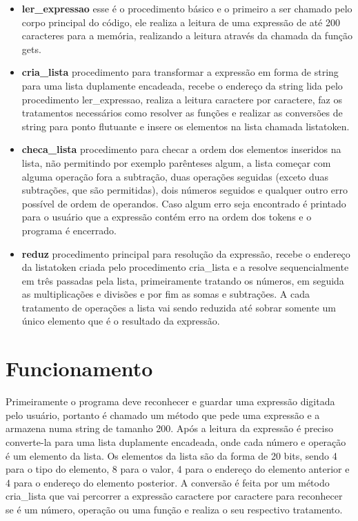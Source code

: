 \documentclass[12pt]{article}
\begin{document}
\begin{itemize}

\item \textbf{ler\_expressao} esse é o procedimento básico e o primeiro a ser chamado pelo corpo principal do código, ele realiza a leitura de uma expressão de até 200 caracteres para a memória, realizando a leitura através da chamada da função gets.

\item \textbf{cria\_lista} procedimento para transformar a expressão em forma de string para uma lista duplamente encadeada, recebe o endereço da string lida pelo procedimento ler\_expressao, realiza a leitura caractere por caractere, faz os tratamentos necessários como resolver as funções e realizar as conversões de string para ponto flutuante e insere os elementos na lista chamada listatoken.

\item \textbf{checa\_lista} procedimento para checar a ordem dos elementos inseridos na lista, não permitindo por exemplo parênteses algum, a lista começar com alguma operação fora a subtração, duas operações seguidas (exceto duas subtrações, que são permitidas), dois números seguidos e qualquer outro erro possível de ordem de operandos. Caso algum erro seja encontrado é printado para o usuário que a expressão contém erro na ordem dos tokens e o programa é encerrado.

\item \textbf{reduz} procedimento principal para resolução da expressão, recebe o endereço da listatoken criada pelo procedimento cria\_lista e a resolve sequencialmente em três passadas pela lista, primeiramente tratando os números, em seguida as multiplicações e divisões e por fim as somas e subtrações. A cada tratamento de operações a lista vai sendo reduzida até sobrar somente um único elemento que é o resultado da expressão.

\end{itemize}

\section*{Funcionamento}

Primeiramente o programa deve reconhecer e guardar uma expressão digitada pelo usuário, portanto é chamado um método que pede uma expressão e a armazena numa string de tamanho 200. Após a leitura da expressão é preciso converte-la para uma lista duplamente encadeada, onde cada número e operação é um elemento da lista. Os elementos da lista são da forma de 20 bits, sendo 4 para o tipo do elemento, 8 para o valor, 4 para o endereço do elemento anterior e 4 para o endereço do elemento posterior. A conversão é feita por um método cria\_lista que vai percorrer a expressão caractere por caractere para reconhecer se é um número, operação ou uma função e realiza o seu respectivo tratamento.
\end{document}
